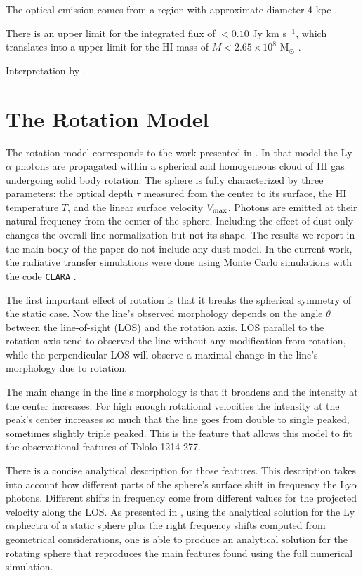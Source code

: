 \documentclass[a4paper, usenatbib, 12pt]{article}
\newcommand{\tol}{Tololo 1214-277}
\newcommand{\lya}{Ly$\alpha$}
\begin{document}
{The optical emission  comes from a   region with approximate diameter
4 kpc \cite{Fricke01}. 

There is an upper limit for the  
integrated flux of $<0.10$ Jy km s$^{-1}$, which translates into a
upper limit for the HI mass of $M<2.65\times 10^{8}$ M$_{\odot}$
\cite{pustilnikmartin07}.  


Interpretation by \cite{mashesse03}.


\section*{The Rotation Model}

The rotation model corresponds to the work presented in
\cite{GaravitoCamargo2014}. 
In that model the Ly-$\alpha$ photons are propagated 
within a spherical and homogeneous cloud of HI gas undergoing solid
body rotation.
The sphere is fully characterized by three parameters: the optical
depth $\tau$ measured from the center to its surface, the HI
temperature $T$, and the linear surface velocity $V_{\rm max}$.  
Photons are emitted at their natural frequency from the center of the
sphere. 
Including the effect of dust only changes the overall line
normalization but not its shape.  
The results we report in the main body of the paper do not include any
dust model.
In the current work, the radiative transfer simulations were done
using Monte Carlo simulations with the code \texttt{CLARA}
\cite{CLARA}.  

The first important effect of rotation is that it breaks the spherical
symmetry of the static case. 
Now the line's observed morphology depends on the angle $\theta$ between the
line-of-sight (LOS) and the rotation axis. 
LOS parallel to the rotation axis tend to observed the line without
any modification from rotation, while the perpendicular LOS will
observe a maximal change in the line's morphology due to rotation.

The main change in the line's morphology is that it broadens and the
intensity at the center increases. 
For high enough rotational velocities the intensity at the peak's
center increases so much that the line goes from double to single
peaked, sometimes slightly triple peaked.
This is the feature that allows this model to fit the observational
features of \tol.

There is a concise analytical description for those features.
This description takes into account how different parts of the
sphere's surface shift in frequency the \lya photons. 
Different shifts in frequency come from different values for the projected
velocity along the LOS. 
As presented in \cite{CLARA}, using the analytical solution for the
\lya sphectra of a static sphere plus the right frequency shifts
computed from geometrical considerations, one is able to produce an
analytical solution for the rotating sphere that reproduces the main
features found using the full numerical simulation.

}
\end{document}
